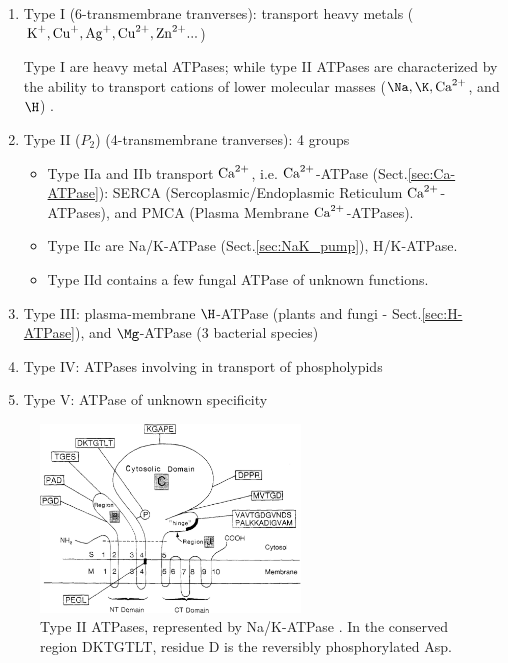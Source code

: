 \begin{enumerate}
  \item Type I (6-transmembrane tranverses): transport heavy metals
    ($\ce{K+}, \ce{Cu+}, \ce{Ag+}, \ce{Cu^2+}, \ce{Zn^2+}...$)

Type I are heavy metal ATPases; while type II ATPases are characterized by the
ability to transport cations of lower molecular masses ($\Na, \K, \Ca$, and
$\H$) \citep{moller1996}.

  \item Type II ($P_2$) (4-transmembrane tranverses): 4 groups
  \begin{itemize}
    
    \item Type IIa and IIb transport ${\text{Ca}^{2+}}$, i.e. ${\text{Ca}^{2+}}$-ATPase
    (Sect.\ref{sec:Ca-ATPase}):  SERCA (Sercoplasmic/Endoplasmic Reticulum
    ${\text{Ca}^{2+}}$-ATPases), and PMCA (Plasma Membrane ${\text{Ca}^{2+}}$-ATPases).
    
    \item Type IIc are Na/K-ATPase (Sect.\ref{sec:NaK_pump}), H/K-ATPase. 
    
    \item Type IId contains a few fungal ATPase
    of unknown functions.
  \end{itemize}



  \item Type III: plasma-membrane $\H$-ATPase (plants and fungi -
  Sect.\ref{sec:H-ATPase}), and $\Mg$-ATPase (3 bacterial species)

  \item Type IV: ATPases involving in transport of phospholypids 
  
  \item Type V: ATPase of unknown specificity
\end{enumerate}


\begin{figure}[hbt]
  \centerline{\includegraphics[height=5cm,
    angle=0]{./images/P-ATPase_type2.eps}}
\caption{Type II ATPases, represented by Na/K-ATPase \citep{moller1996}. In the
conserved region DKTGTLT, residue D is the reversibly phosphorylated Asp.}
\label{fig:P-ATPase_type2}
\end{figure}


